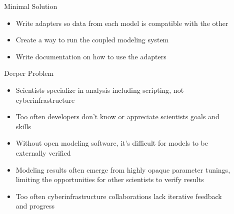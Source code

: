 \documentclass[final]{beamer}
\newlength{\sepwid}
\newlength{\onecolwid}
\newlength{\twocolwid}
\begin{document}
\begin{frame}[t]
\begin{columns}[t]
\begin{column}{\onecolwid}
\begin{block}{Minimal Solution}
    \begin{itemize}
        \item Write adapters so data from each model is compatible with the other
        \item Create a way to run the coupled modeling system
        \item Write documentation on how to use the adapters
    \end{itemize}
\end{block}

\begin{block}{Deeper Problem}
    \begin{itemize}
        \item Scientists specialize in analysis including scripting, not cyberinfrastructure
        \item Too often developers don't know or appreciate scientists goals and skills
        \item Without open modeling software, it's difficult for models to be externally verified
        \item Modeling results often emerge from highly opaque parameter tunings, limiting the opportunities
            for other scientists to verify results
        \item Too often cyberinfrastructure collaborations lack iterative feedback and progress
    \end{itemize}

\end{block}






\end{column} %

\begin{column}{\sepwid}\end{column} %

\begin{column}{\twocolwid} %


\end{column}
\end{columns}
\end{frame}
\end{document}
